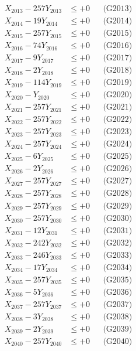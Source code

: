 \documentclass[a4paper,10pt]{article}
\begin{document}
{\begin{align}
X_{2013} - 257Y_{2013} &\leq +0 && \text{(G2013)} \\
X_{2014} - 19Y_{2014} &\leq +0 && \text{(G2014)} \\
X_{2015} - 257Y_{2015} &\leq +0 && \text{(G2015)} \\
X_{2016} - 74Y_{2016} &\leq +0 && \text{(G2016)} \\
X_{2017} - 9Y_{2017} &\leq +0 && \text{(G2017)} \\
X_{2018} - 2Y_{2018} &\leq +0 && \text{(G2018)} \\
X_{2019} - 114Y_{2019} &\leq +0 && \text{(G2019)} \\
X_{2020} - Y_{2020} &\leq +0 && \text{(G2020)} \\
\allowbreak
X_{2021} - 257Y_{2021} &\leq +0 && \text{(G2021)} \\
X_{2022} - 257Y_{2022} &\leq +0 && \text{(G2022)} \\
X_{2023} - 257Y_{2023} &\leq +0 && \text{(G2023)} \\
X_{2024} - 257Y_{2024} &\leq +0 && \text{(G2024)} \\
X_{2025} - 6Y_{2025} &\leq +0 && \text{(G2025)} \\
X_{2026} - 2Y_{2026} &\leq +0 && \text{(G2026)} \\
X_{2027} - 257Y_{2027} &\leq +0 && \text{(G2027)} \\
X_{2028} - 257Y_{2028} &\leq +0 && \text{(G2028)} \\
X_{2029} - 257Y_{2029} &\leq +0 && \text{(G2029)} \\
X_{2030} - 257Y_{2030} &\leq +0 && \text{(G2030)} \\
\allowbreak
X_{2031} - 12Y_{2031} &\leq +0 && \text{(G2031)} \\
X_{2032} - 242Y_{2032} &\leq +0 && \text{(G2032)} \\
X_{2033} - 246Y_{2033} &\leq +0 && \text{(G2033)} \\
X_{2034} - 17Y_{2034} &\leq +0 && \text{(G2034)} \\
X_{2035} - 257Y_{2035} &\leq +0 && \text{(G2035)} \\
X_{2036} - 5Y_{2036} &\leq +0 && \text{(G2036)} \\
X_{2037} - 257Y_{2037} &\leq +0 && \text{(G2037)} \\
X_{2038} - 3Y_{2038} &\leq +0 && \text{(G2038)} \\
X_{2039} - 2Y_{2039} &\leq +0 && \text{(G2039)} \\
X_{2040} - 257Y_{2040} &\leq +0 && \text{(G2040)} \\

\end{align}}
\end{document}
